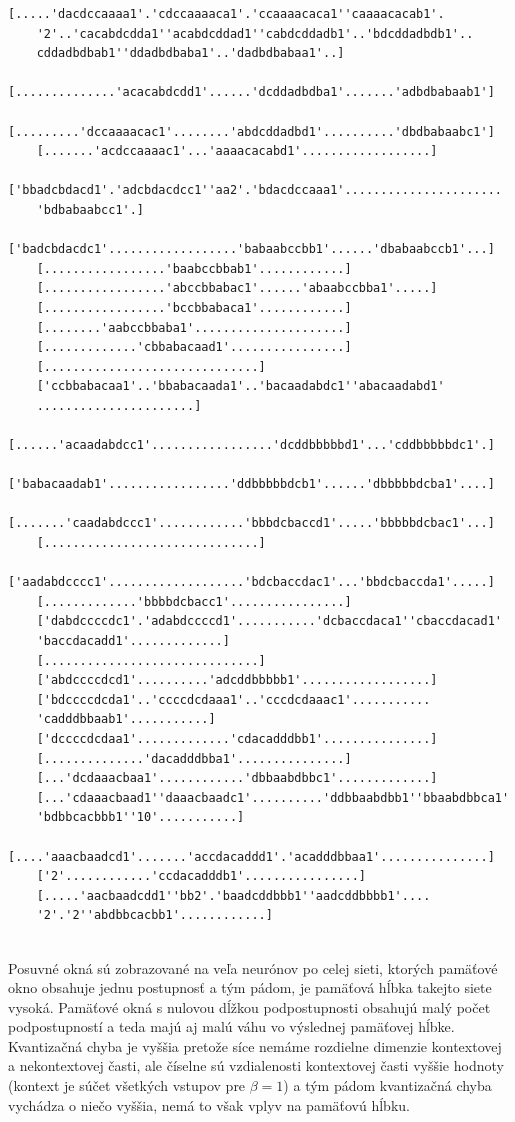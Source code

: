 \begin{lstlisting}[basicstyle=\footnotesize]
    [.....'dacdccaaaa1'.'cdccaaaaca1'.'ccaaaacaca1''caaaacacab1'.
    '2'..'cacabdcdda1''acabdcddad1''cabdcddadb1'..'bdcddadbdb1'..
    cddadbdbab1''ddadbdbaba1'..'dadbdbabaa1'..]
    [..............'acacabdcdd1'......'dcddadbdba1'.......'adbdbabaab1']
    [.........'dccaaaacac1'........'abdcddadbd1'..........'dbdbabaabc1']
    [.......'acdccaaaac1'...'aaaacacabd1'..................]
    ['bbadcbdacd1'.'adcbdacdcc1''aa2'.'bdacdccaaa1'......................
    'bdbabaabcc1'.]
    ['badcbdacdc1'..................'babaabccbb1'......'dbabaabccb1'...]
    [.................'baabccbbab1'............]
    [.................'abccbbabac1'......'abaabccbba1'.....]
    [.................'bccbbabaca1'............]
    [........'aabccbbaba1'.....................]
    [.............'cbbabacaad1'................]
    [..............................]
    ['ccbbabacaa1'..'bbabacaada1'..'bacaadabdc1''abacaadabd1'
    ......................]
    [......'acaadabdcc1'.................'dcddbbbbbd1'...'cddbbbbbdc1'.]
    ['babacaadab1'.................'ddbbbbbdcb1'......'dbbbbbdcba1'....]
    [.......'caadabdccc1'............'bbbdcbaccd1'.....'bbbbbdcbac1'...]
    [..............................]
    ['aadabdcccc1'...................'bdcbaccdac1'...'bbdcbaccda1'.....]
    [.............'bbbbdcbacc1'................]
    ['dabdccccdc1'.'adabdccccd1'...........'dcbaccdaca1''cbaccdacad1'
    'baccdacadd1'.............]
    [..............................]
    ['abdccccdcd1'..........'adcddbbbbb1'..................]
    ['bdccccdcda1'..'ccccdcdaaa1'..'cccdcdaaac1'...........
    'cadddbbaab1'...........]
    ['dccccdcdaa1'.............'cdacadddbb1'...............]
    [..............'dacadddbba1'...............]
    [...'dcdaaacbaa1'............'dbbaabdbbc1'.............]
    [...'cdaaacbaad1''daaacbaadc1'..........'ddbbaabdbb1''bbaabdbbca1'
    'bdbbcacbbb1''10'...........]
    [....'aaacbaadcd1'.......'accdacaddd1'.'acadddbbaa1'...............]
    ['2'............'ccdacadddb1'................]
    [.....'aacbaadcdd1''bb2'.'baadcddbbb1''aadcddbbbb1'....
    '2'.'2''abdbbcacbb1'............]
    
\end{lstlisting}

Posuvné okná sú zobrazované na veľa neurónov po celej sieti, ktorých pamäťové okno obsahuje jednu postupnosť
a tým pádom, je pamäťová hĺbka takejto siete vysoká. Pamäťové okná s nulovou dĺžkou podpostupnosti obsahujú malý počet podpostupností a teda majú aj malú váhu vo výslednej pamäťovej hĺbke.
Kvantizačná chyba je vyššia pretože síce nemáme rozdielne dimenzie kontextovej a nekontextovej časti, 
ale číselne sú vzdialenosti kontextovej časti vyššie hodnoty (kontext je súčet všetkých vstupov pre $\beta = 1$) a tým pádom
kvantizačná chyba vychádza o niečo vyššia, nemá to však vplyv na pamäťovú hĺbku.



